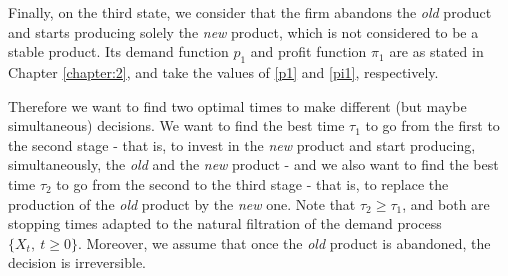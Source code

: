 








Finally, on the third state, we consider that the firm abandons the \textit{old} product and starts producing solely the \textit{new} product, which is not considered to be a stable product. Its demand function $p_1$ and profit function $\pi_1$ are as stated in Chapter \ref{chapter:2}, and take the values of \eqref{p1} and \eqref{pi1}, respectively.


Therefore we want to find two optimal times to make different (but maybe simultaneous) decisions. We want to find the best time $\tau_1$ to go from the first to the second stage - that is, to invest in the \textit{new} product and start producing, simultaneously, the \textit{old} and the \textit{new} product - and we also want to find the best time $\tau_2$ to go from the second to the third stage - that is, to replace the production of the \textit{old} product by the \textit{new} one. Note that $\tau_2 \geq \tau_1$, and both are stopping times adapted to the natural filtration of the demand process $\{ X_t, \ t\geq0 \}$. Moreover, we assume that once the \textit{old} product is abandoned, the decision is irreversible.

